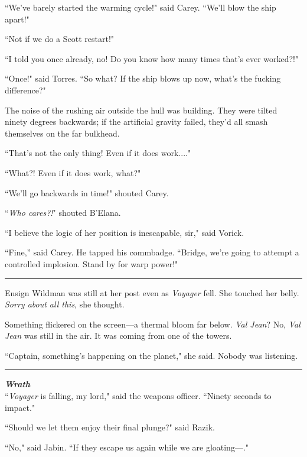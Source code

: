 \documentclass[twoside,letterpaper,12pt]{memoir}
\begin{document}
``We've barely started the warming cycle!" said Carey. ``We'll blow the ship apart!"

``Not if we do a Scott restart!"

``I told you once already, no! Do you know how many times that's ever worked?!"

``Once!" said Torres. ``So what? If the ship blows up now, what's the fucking difference?"

The noise of the rushing air outside the hull was building. They were tilted ninety degrees backwards; if the artificial gravity failed, they'd all smash themselves on the far bulkhead.

``That's not the only thing! Even if it does work...."

``What?! Even if it does work, what?"

``We'll go backwards in time!" shouted Carey.

``\textit{Who cares?!}" shouted B'Elana.

``I believe the logic of her position is inescapable, sir," said Vorick.

``Fine,” said Carey. He tapped his commbadge. ``Bridge, we're going to attempt a controlled implosion. Stand by for warp power!"

\begin{center}\rule{3cm}{0.4 pt}\end{center}

Ensign Wildman was still at her post even as \textit{Voyager} fell. She touched her belly. \textit{Sorry about all this}, she thought.

Something flickered on the screen---a thermal bloom far below. \textit{Val Jean}? No, \textit{Val Jean} was still in the air. It was coming from one of the towers.

``Captain, something's happening on the planet," she said. Nobody was listening.

\begin{center}\rule{3cm}{0.4 pt}\end{center}

\noindent\textit{\textbf{Wrath}}\\

``\textit{Voyager} is falling, my lord," said the weapons officer. ``Ninety seconds to impact."

``Should we let them enjoy their final plunge?" said Razik.

``No," said Jabin. ``If they escape us again while we are gloating---."
\end{document}
